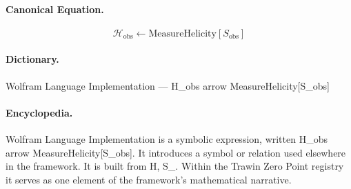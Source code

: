 \paragraph{Canonical Equation.}
\[
\mathcal{H}_{\text{obs}} \leftarrow \text{MeasureHelicity}[S_{\text{obs}}]
\]

\paragraph{Dictionary.}
Wolfram Language Implementation — H\_obs arrow MeasureHelicity[S\_obs]

\paragraph{Encyclopedia.}
Wolfram Language Implementation is a symbolic expression, written H\_obs arrow MeasureHelicity[S\_obs]. It introduces a symbol or relation used elsewhere in the framework. It is built from H, S\_. Within the Trawin Zero Point registry it serves as one element of the framework's mathematical narrative.
